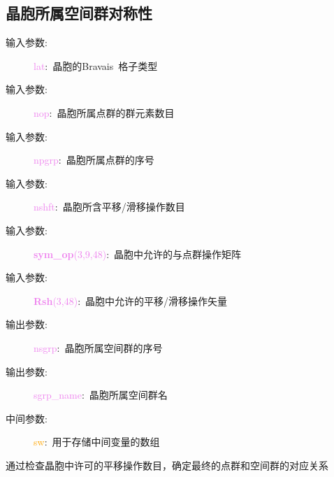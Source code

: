 \documentclass{article}      %
\begin{document}
\subsection{晶胞所属空间群对称性}
\begin{description}
	\item[输入参数:~]\textcolor{violet}{\textrm{lat}}:~晶胞的\textrm{Bravais~}格子类型
	\item[输入参数:~]\textcolor{violet}{\textrm{nop}}:~晶胞所属点群的群元素数目
	\item[输入参数:~]\textcolor{violet}{\textrm{npgrp}}:~晶胞所属点群的序号
	\item[输入参数:~]\textcolor{violet}{\textrm{nshft}}:~晶胞所含平移/滑移操作数目
	\item[输入参数:~]\textcolor{violet}{\textbf{sym\_op}(3,9,48)}:~晶胞中允许的与点群操作矩阵
	\item[输入参数:~]\textcolor{violet}{\textbf{Rsh}(3,48)}:~晶胞中允许的平移/滑移操作矢量
	\item[输出参数:~]\textcolor{violet}{\textrm{nsgrp}}:~晶胞所属空间群的序号
	\item[输出参数:~]\textcolor{violet}{\textrm{sgrp\_name}}:~晶胞所属空间群名
	\item[中间参数:~]\textcolor{orange}{\textrm{sw}}:~用于存储中间变量的数组
\end{description}
通过检查晶胞中许可的平移操作数目，确定最终的点群和空间群的对应关系
\end{document}

